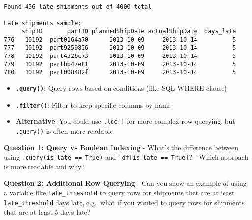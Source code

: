 \documentclass[
  letterpaper,
  DIV=11,
  numbers=noendperiod]{scrartcl}
\providecommand{\tightlist}{%
  \setlength{\itemsep}{0pt}\setlength{\parskip}{0pt}}
\begin{document}
\begin{verbatim}
Found 456 late shipments out of 4000 total

Late shipments sample:
     shipID       partID plannedShipDate actualShipDate  days_late
776   10192  part0164a70      2013-10-09     2013-10-14          5
777   10192  part9259836      2013-10-09     2013-10-14          5
778   10192  part4526c73      2013-10-09     2013-10-14          5
779   10192  partbb47e81      2013-10-09     2013-10-14          5
780   10192  part008482f      2013-10-09     2013-10-14          5
\end{verbatim}

\begin{tcolorbox}[enhanced jigsaw, colbacktitle=quarto-callout-note-color!10!white, opacitybacktitle=0.6, colframe=quarto-callout-note-color-frame, coltitle=black, left=2mm, titlerule=0mm, title=\textcolor{quarto-callout-note-color}{\faInfo}\hspace{0.5em}{🔍 Understanding the Methods}, bottomtitle=1mm, opacityback=0, arc=.35mm, rightrule=.15mm, colback=white, breakable, bottomrule=.15mm, toprule=.15mm, toptitle=1mm, leftrule=.75mm]

\begin{itemize}
\tightlist
\item
  \textbf{\texttt{.query()}}: Query rows based on conditions (like SQL
  WHERE clause)
\item
  \textbf{\texttt{.filter()}}: Filter to keep specific columns by name
\item
  \textbf{Alternative}: You could use \texttt{.loc{[}{]}} for more
  complex row querying, but \texttt{.query()} is often more readable
\end{itemize}

\end{tcolorbox}

\begin{tcolorbox}[enhanced jigsaw, colbacktitle=quarto-callout-important-color!10!white, opacitybacktitle=0.6, colframe=quarto-callout-important-color-frame, coltitle=black, left=2mm, titlerule=0mm, title=\textcolor{quarto-callout-important-color}{\faExclamation}\hspace{0.5em}{🤔 Discussion Questions: Subset Mental Model}, bottomtitle=1mm, opacityback=0, arc=.35mm, rightrule=.15mm, colback=white, breakable, bottomrule=.15mm, toprule=.15mm, toptitle=1mm, leftrule=.75mm]

\textbf{Question 1: Query vs Boolean Indexing} - What's the difference
between using
\texttt{.query(\textquotesingle{}is\_late\ ==\ True\textquotesingle{})}
and
\texttt{{[}df{[}\textquotesingle{}is\_late\textquotesingle{}{]}\ ==\ True{]}}?
- Which approach is more readable and why?

\textbf{Question 2: Additional Row Querying} - Can you show an example
of using a variable like \texttt{late\_threshold} to query rows for
shipments that are at least \texttt{late\_threshold} days late,
e.g.~what if you wanted to query rows for shipments that are at least 5
days late?

\end{tcolorbox}
\end{document}
